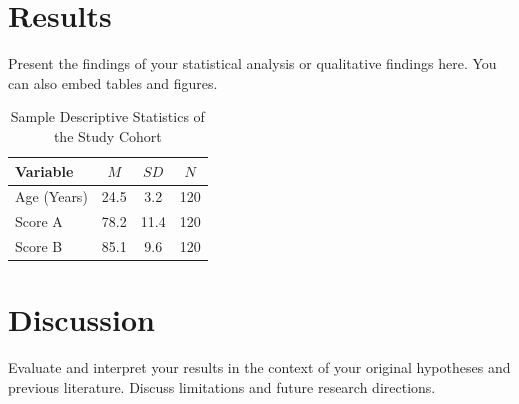 \documentclass[manuscript,noextraspace]{apa7}
\begin{document}
\section{Results}
Present the findings of your statistical analysis or qualitative findings here. You can also embed tables and figures.

\begin{table}[htbp]
\caption{Sample Descriptive Statistics of the Study Cohort}
\label{tab:sample_table}
\centering
\begin{tabular}{lccc}
\hline
Variable & $M$ & $SD$ & $N$ \\
\hline
Age (Years) & 24.5 & 3.2 & 120 \\
Score A & 78.2 & 11.4 & 120 \\
Score B & 85.1 & 9.6 & 120 \\
\hline
\end{tabular}
\end{table}

\section{Discussion}
Evaluate and interpret your results in the context of your original hypotheses and previous literature. Discuss limitations and future research directions.

\printbibliography
\end{document}
